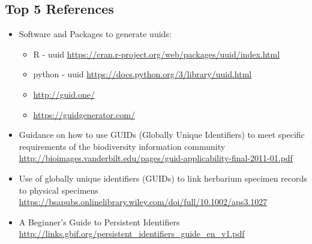 \documentclass[
  oneside]{book}
\providecommand{\tightlist}{%
  \setlength{\itemsep}{0pt}\setlength{\parskip}{0pt}}
\begin{document}
\hypertarget{top-5-references-5}{%
\subsection{Top 5 References}\label{top-5-references-5}}

\begin{itemize}
\tightlist
\item
  Software and Packages to generate uuids:

  \begin{itemize}
  \tightlist
  \item
    R - uuid \url{https://cran.r-project.org/web/packages/uuid/index.html}
  \item
    python - uuid \url{https://docs.python.org/3/library/uuid.html}
  \item
    \url{http://guid.one/}
  \item
    \url{https://guidgenerator.com/}
  \end{itemize}
\item
  Guidance on how to use GUIDs (Globally Unique Identifiers) to meet specific requirements of the biodiversity information community\\
  \url{http://bioimages.vanderbilt.edu/pages/guid-applicability-final-2011-01.pdf}
\item
  Use of globally unique identifiers (GUIDs) to link herbarium specimen records to physical specimens\\
  \url{https://bsapubs.onlinelibrary.wiley.com/doi/full/10.1002/aps3.1027}
\item
  A Beginner's Guide to Persistent Identifiers\\
  \url{http://links.gbif.org/persistent_identifiers_guide_en_v1.pdf}
\end{itemize}
\end{document}
